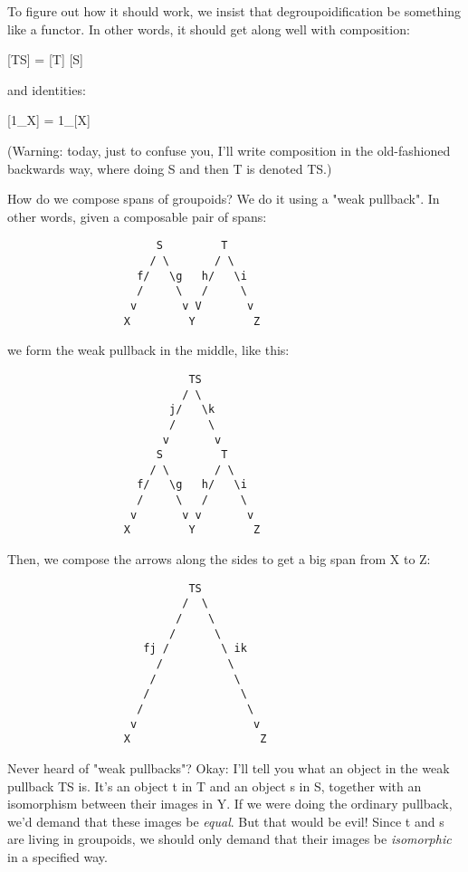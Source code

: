 To figure out how it should work, we insist that degroupoidification 
be something like a functor.  In other words, it should get along 
well with composition:

[TS] = [T] [S]

and identities:

[1_{X}] = 1_{[X]}

(Warning: today, just to confuse you, I'll write composition in 
the old-fashioned backwards way, where doing S and then T is 
denoted TS.)

How do we compose spans of groupoids?  We do it using a "weak 
pullback".  In other words, given a composable pair of spans:

\begin{verbatim}
                       S         T
                      / \       / \
                    f/   \g   h/   \i
                    /     \   /     \
                   v       v V       v
                  X         Y         Z
\end{verbatim}
    
we form the weak pullback in the middle, like this:

\begin{verbatim}
                            TS
                           / \
                         j/   \k
                         /     \
                        v       v
                       S         T
                      / \       / \
                    f/   \g   h/   \i
                    /     \   /     \
                   v       v v       v
                  X         Y         Z
\end{verbatim}
    
Then, we compose the arrows along the sides to get a big span 
from X to Z:

\begin{verbatim}
                            TS
                           /  \
                          /    \
                         /      \
                     fj /        \ ik
                       /          \
                      /            \
                     /              \
                    /                \
                   v                  v
                  X                    Z
\end{verbatim}
    
Never heard of "weak pullbacks"?  Okay: I'll tell you what an 
object in the weak pullback TS is.  It's an object t in T and an 
object s in S, together with an isomorphism between their images in Y.  
If we were doing the ordinary pullback, we'd demand that these
images be \emph{equal}.  But that would be evil!  Since t and s are living 
in groupoids, we should only demand that their images be \emph{isomorphic} 
in a specified way.  

